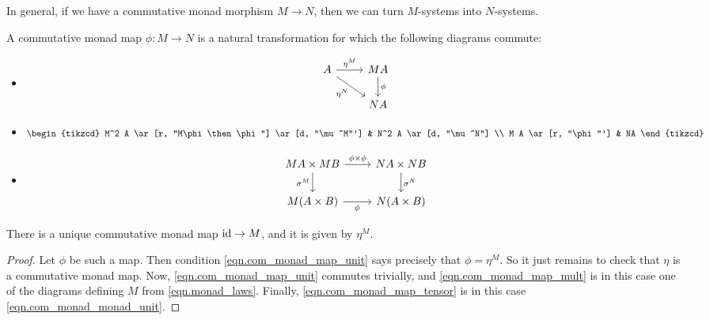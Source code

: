 \documentclass[DynamicalBook]{subfiles}
\begin{document}
In general, if we have a commutative monad morphism $M \to N$, then we can turn
$M$-systems into $N$-systems.

\begin{definition}\label{def.com_monad_map}
A commutative monad map $\phi : M \to N$ is a natural transformation for which
the following diagrams commute:
\begin{itemize}
\item
  \begin{equation}\label{eqn.com_monad_map_unit}
    \begin{tikzcd}
    A \ar[r, "\eta^M"] \ar[dr, "\eta^N"'] & M A \ar[d, "\phi"] \\
    & N A
    \end{tikzcd}
  \end{equation}
\item
  \begin{equation}\label{eqn.com_monad_map_mult}
    \begin{tikzcd}
    M^2 A \ar[r, "M\phi \then \phi"] \ar[d, "\mu^M"'] & N^2 A \ar[d, "\mu^N"] \\
    M A \ar[r, "\phi"'] & NA
    \end{tikzcd}
  \end{equation}
\item
  \begin{equation}\label{eqn.com_monad_map_tensor}
    \begin{tikzcd}
    MA \times M B \ar[r, "\phi \times \phi"] \ar[d, "\sigma^M"'] & N A \times N B \ar[d, "\sigma^N"] \\
    M (A \times B) \ar[r, "\phi"'] & N(A \times B)
    \end{tikzcd}
  \end{equation}
\end{itemize}
\end{definition}



\begin{proposition}
  There is a unique commutative monad map $\mathrm{id} \to M$, and it is given by
  $\eta^M$. \end{proposition}
\begin{proof}
Let $\phi$ be such a map. Then condition \cref{eqn.com_monad_map_unit} says
precisely that $\phi = \eta^M$. So it just remains to check that $\eta$ is a commutative monad map.
  Now, \cref{eqn.com_monad_map_unit} commutes trivially, and
  \cref{eqn.com_monad_map_mult} is in this case one of the diagrams defining $M$
  from \cref{eqn.monad_laws}. Finally, \cref{eqn.com_monad_map_tensor} is in
  this case \cref{eqn.com_monad_monad_unit}.
\end{proof}
\end{document}
